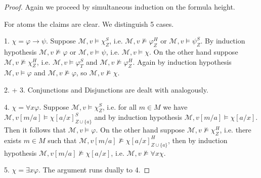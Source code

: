 \documentclass[runningheads]{llncs}
\begin{document}
\begin{proof}
	Again we proceed by simultaneous induction on the formula height.
	
	For atoms the claims are clear. We distinguish 5 cases.
	
	1. $\chi = \varphi\to\psi$. Suppose $\mathcal M, v\models\chi^S_Z$, i.e. $\mathcal M, v\not\models\varphi^H_Z$ or $\mathcal M, v\models\psi^S_Z$. By induction hypothesis $\mathcal M, v\not\models \varphi$ or $\mathcal M, v\models\psi$, i.e. $\mathcal M, v\models \chi$. On the other hand suppose $\mathcal M, v\not\models\chi^H_Z$, i.e. $\mathcal M, v\models\varphi^S_T$ and $\mathcal M, v\not\models\varphi^H_Z$. Again by induction hypothesis $\mathcal M,v\models\varphi$ and $\mathcal M, v\not\models \varphi$, so $\mathcal M, v\not\models\chi$.
	
	2. + 3. Conjunctions and Disjunctions are dealt with analogously.
	
	4. $\chi = \forall x\varphi$.  Suppose $\mathcal M, v\models\chi^S_Z$, i.e. for all $m\in M$ we have $\mathcal M, v[m/a]\models \chi[a/x]^S_{Z\cup\{a\}}$ and by induction hypothesis $\mathcal M, v[m/a]\models \chi[a/x]$. Then it follows that $\mathcal M, v\models\varphi$. On the other hand suppose $\mathcal M, v\not\models\chi^H_Z$, i.e. there exists $m\in M$ such that $\mathcal M, v[m/a]\not\models\chi[a/x]^H_{Z\cup \{a\}}$, then by induction hypothesis $\mathcal M, v[m/a]\not\models \chi[a/x]$, i.e. $\mathcal M, v\not\models\forall x\chi$.
	
	5. $\chi = \exists x\varphi$.  The argument runs dually to 4.
\end{proof}
\end{document}
